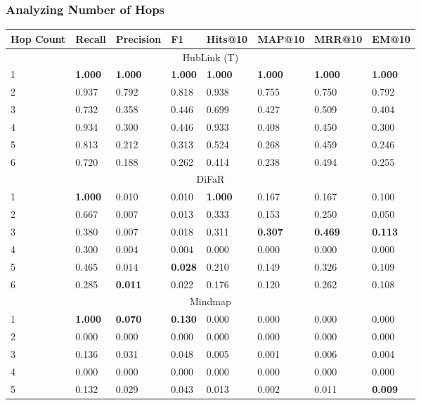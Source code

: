 \subsubsection{Analyzing Number of Hops}
\begin{table}[t]
\centering
\begin{tabular}{@{}llllllll@{}}
\toprule
Hop Count & Recall & Precision & F1 & Hits@10 & MAP@10 & MRR@10 & EM@10 \\
\midrule
\multicolumn{8}{c}{HubLink (T)} \\
\midrule
1 & \textbf{1.000} & \textbf{1.000} & \textbf{1.000} & \textbf{1.000} & \textbf{1.000} & \textbf{1.000} & \textbf{1.000} \\
2 & 0.937 & 0.792 & 0.818 & 0.938 & 0.755 & 0.750 & 0.792 \\
3 & 0.732 & 0.358 & 0.446 & 0.699 & 0.427 & 0.509 & 0.404 \\
4 & 0.934 & 0.300 & 0.446 & 0.933 & 0.408 & 0.450 & 0.300 \\
5 & 0.813 & 0.212 & 0.313 & 0.524 & 0.268 & 0.459 & 0.246 \\
6 & 0.720 & 0.188 & 0.262 & 0.414 & 0.238 & 0.494 & 0.255 \\
\midrule
\multicolumn{8}{c}{DiFaR} \\
\midrule
1 & \textbf{1.000} & 0.010 & 0.010 & \textbf{1.000} & 0.167 & 0.167 & 0.100 \\
2 & 0.667 & 0.007 & 0.013 & 0.333 & 0.153 & 0.250 & 0.050 \\
3 & 0.380 & 0.007 & 0.018 & 0.311 & \textbf{0.307} & \textbf{0.469} & \textbf{0.113} \\
4 & 0.300 & 0.004 & 0.004 & 0.000 & 0.000 & 0.000 & 0.000 \\
5 & 0.465 & 0.014 & \textbf{0.028} & 0.210 & 0.149 & 0.326 & 0.109 \\
6 & 0.285 & \textbf{0.011} & 0.022 & 0.176 & 0.120 & 0.262 & 0.108 \\
\midrule
\multicolumn{8}{c}{Mindmap} \\
\midrule
1 & \textbf{1.000} & \textbf{0.070} & \textbf{0.130} & 0.000 & 0.000 & 0.000 & 0.000 \\
2 & 0.000 & 0.000 & 0.000 & 0.000 & 0.000 & 0.000 & 0.000 \\
3 & 0.136 & 0.031 & 0.048 & 0.005 & 0.001 & 0.006 & 0.004 \\
4 & 0.000 & 0.000 & 0.000 & 0.000 & 0.000 & 0.000 & 0.000 \\
5 & 0.132 & 0.029 & 0.043 & 0.013 & 0.002 & 0.011 & \textbf{0.009} \\

\end{tabular}
\end{table}
